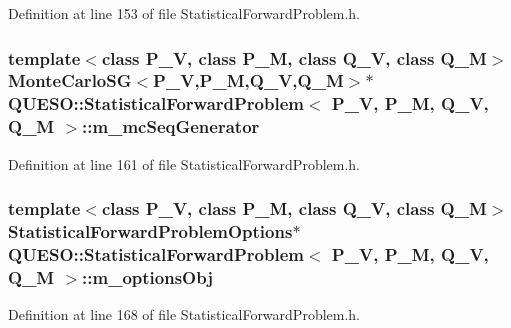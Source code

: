 Definition at line 153 of file Statistical\-Forward\-Problem.\-h.

\hypertarget{class_q_u_e_s_o_1_1_statistical_forward_problem_a18f3f73759fbc2e64486b11c13b3fbf5}{
\subsubsection[{m\-\_\-mc\-Seq\-Generator}]{\setlength{\rightskip}{0pt plus 5cm}template$<$class P\-\_\-\-V, class P\-\_\-\-M, class Q\-\_\-\-V, class Q\-\_\-\-M$>$ {\bf Monte\-Carlo\-S\-G}$<$P\-\_\-\-V,P\-\_\-\-M,Q\-\_\-\-V,Q\-\_\-\-M$>$$\ast$ {\bf Q\-U\-E\-S\-O\-::\-Statistical\-Forward\-Problem}$<$ P\-\_\-\-V, P\-\_\-\-M, Q\-\_\-\-V, Q\-\_\-\-M $>$\-::m\-\_\-mc\-Seq\-Generator\hspace{0.3cm}{\ttfamily [private]}}}\label{class_q_u_e_s_o_1_1_statistical_forward_problem_a18f3f73759fbc2e64486b11c13b3fbf5}


Definition at line 161 of file Statistical\-Forward\-Problem.\-h.

\hypertarget{class_q_u_e_s_o_1_1_statistical_forward_problem_a4c286957fda7c134718422d9d4e4f1ca}{
\subsubsection[{m\-\_\-options\-Obj}]{\setlength{\rightskip}{0pt plus 5cm}template$<$class P\-\_\-\-V, class P\-\_\-\-M, class Q\-\_\-\-V, class Q\-\_\-\-M$>$ {\bf Statistical\-Forward\-Problem\-Options}$\ast$ {\bf Q\-U\-E\-S\-O\-::\-Statistical\-Forward\-Problem}$<$ P\-\_\-\-V, P\-\_\-\-M, Q\-\_\-\-V, Q\-\_\-\-M $>$\-::m\-\_\-options\-Obj\hspace{0.3cm}{\ttfamily [private]}}}\label{class_q_u_e_s_o_1_1_statistical_forward_problem_a4c286957fda7c134718422d9d4e4f1ca}


Definition at line 168 of file Statistical\-Forward\-Problem.\-h.

